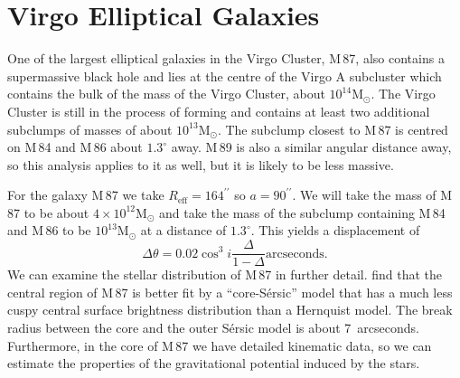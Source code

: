 \documentclass[useAMS,usenatbib]{mn2e}
\newcommand{\msun}{\mathrm{M}_\odot}
\begin{document}
\section{Virgo Elliptical Galaxies}

One of the largest elliptical galaxies in the Virgo Cluster, M\,87,
also contains a supermassive black hole and lies at the centre of the
Virgo A subcluster which contains the bulk of the mass of the Virgo
Cluster, about $10^{14} \msun$.  The Virgo Cluster is still in the
process of forming and contains at least two additional subclumps of
masses of about $10^{13} \msun$.  The subclump closest to M\,87 is
centred on M\,84 and M\,86 about $1.3^\circ$ away.  M\,89 is also a
similar angular distance away, so this analysis applies to it as well,
but it is likely to be less massive.

For the galaxy M\,87 we take $R_\mathrm{eff}=164^{\prime\prime}$
\citep{2006ApJS..164..334F} so $a=90^{\prime\prime}$.  We will take
the mass of M\,87 to be about $4\times 10^{12} \msun$
\citep{2006ApJ...643..210W} and take the mass of the subclump
containing M\,84 and M\,86 to be $10^{13} \msun$ at a distance of
$1.3^\circ$. This yields a displacement of
\begin{equation}
  \Delta \theta = 0.02 \cos^3 i \frac{\Delta}{1-\Delta} 
  \mathrm{arcseconds}.
  \label{eq:13}
\end{equation}
We can examine the stellar distribution of M\,87 in further detail.
\citet{2006ApJS..164..334F} find that the central region of M\,87 is
better fit by a ``core-S\'ersic'' model
\citep{1968adga.book.....S,2004AJ....127.1917T} that has a much less
cuspy central surface brightness distribution than a Hernquist model.
The break radius between the core and the outer S\'ersic model is
about 7~arcseconds.  Furthermore, in the core of M\,87 we have
detailed kinematic data, so we can estimate the properties of the
gravitational potential induced by the stars.
\end{document}
